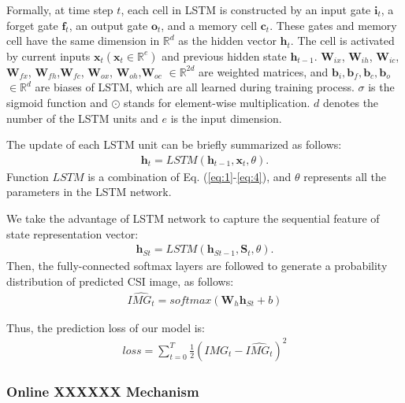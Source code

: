 \documentclass[10pt,conference,letterpaper]{IEEEtran}
\begin{document}
Formally, at time step $t$, each cell in LSTM is constructed by an input gate $\textbf{i}_{t}$, a forget gate $\textbf{f}_{t}$, an output gate $\textbf{o}_{t}$, and a memory cell $\textbf{c}_{t}$. These gates and memory cell have the same dimension in ${\mathbb{R}^{d}}$ as the hidden vector $\mathbf{h}_t$. The cell is activated by current inputs $\textbf{x}_{t}$$(\textbf{x}_t \in {\mathbb{R}^{e}})$ and previous hidden state $\textbf{h}_{t-1}$. $\mathbf{W}_{ix}$, $\mathbf{W}_{ih}$, $\mathbf{W}_{ic}$, $\mathbf{W}_{fx}$, $\mathbf{W}_{fh}$,$\mathbf{W}_{fc}$, $\mathbf{W}_{ox}$, $\mathbf{W}_{oh}$,$\mathbf{W}_{oc}$ $\in {\mathbb{R}^{2d}}$ are weighted matrices, and $\textbf{b}_i, \textbf{b}_f, \textbf{b}_c, \textbf{b}_o$ $\in {\mathbb{R}^{d}}$ are biases of LSTM, which are all learned during training process. $\sigma$ is the sigmoid function and $\odot$ stands for element-wise multiplication. $d$ denotes the number of the LSTM units and $e$ is the input dimension.

The update of each LSTM unit can be briefly summarized as follows:
\begin{eqnarray}
\mathbf{h}_{t} = LSTM(\mathbf{h}_{t-1}, \mathbf{x}_{t}, \theta).
\end{eqnarray}
Function $LSTM$ is a combination of Eq. (\ref{eq:1}-\ref{eq:4}), and $\theta$ represents all the parameters in the LSTM network. 

We take the advantage of LSTM network to capture the sequential feature of state representation vector:
\begin{eqnarray}
\mathbf{h}_{St}= LSTM(\mathbf{h}_{St-1}, \mathbf{S}_{t}, \theta).
\end{eqnarray}
Then, the fully-connected softmax layers are followed to generate a probability distribution of predicted CSI image, as follows:
\begin{eqnarray}
\widehat{\textit{IMG} _t}  = softmax(\mathbf{W}_h\mathbf{h}_{St} + b)
\end{eqnarray}

Thus, the prediction loss of our model is:
\begin{eqnarray}
loss = {\sum\limits_{t = 0}^T {\frac{1}{2}}\left( {IM{G_t} - \widehat {\textit{IMG} _t} }  \right)^2}
\end{eqnarray}

\subsubsection{Online XXXXXX Mechanism}
\end{document}
